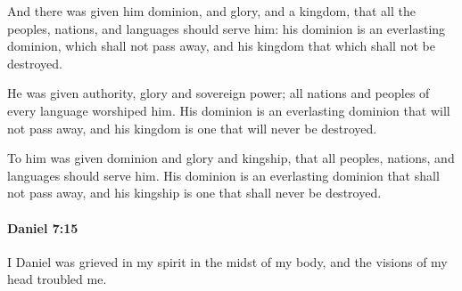 			\begin{versebox}
					\item[BHS] 
					\item[LXX] 
					\item[ASV] And there was given him dominion, and glory, and a kingdom, that all the peoples, nations, and languages should serve him: his dominion is an everlasting dominion, which shall not pass away, and his kingdom that which shall not be destroyed.
					\item[NIV] He was given authority, glory and sovereign power; all nations and peoples of every language worshiped him. His dominion is an everlasting dominion that will not pass away, and his kingdom is one that will never be destroyed.
					\item[NRSV] To him was given dominion and glory and kingship, that all peoples, nations, and languages should serve him. His dominion is an everlasting dominion that shall not pass away, and his kingship is one that shall never be destroyed.
			\end{versebox}

		\paragraph{Daniel 7:15} %
			\label{DANIEL-7-15}

			I Daniel was grieved in my spirit in the midst of my body, and the visions of my head troubled me.

